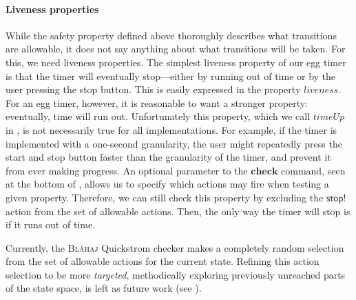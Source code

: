 \documentclass[sigplan,nonacm,10pt]{acmart}
\makeatletter
\newcommand{\Quickstrom}[0]{%
  \if@ACM@anonymous%
  \textsc{Bl\aa{}haj}%
  \else%
  Quickstrom%
  \fi\xspace}
\makeatother
\begin{document}
 \paragraph{Liveness properties} While the safety property defined above thoroughly describes what transitions are allowable, it does not say anything about what
 transitions will be taken. For this, we need liveness properties. The simplest liveness property of our egg timer is that the timer will eventually stop---either by running out of time or by the user pressing the stop button.
 This is easily expressed in the property $\mathit{liveness}$. For an egg timer, however, it is reasonable to want a stronger property: eventually, time will run out. Unfortunately this property, which we call $\mathit{timeUp}$ in , is not necessarily
 true for all implementations. For example, if the timer is implemented with a one-second granularity, the user might repeatedly press the start and stop button faster than the granularity of the timer, and prevent it
 from ever making progress. An optional parameter to the $\mathbf{check}$ command, seen at the bottom of , allows us to specify which actions may fire when testing a given property.
 Therefore, we can still check this property by excluding the $\mathsf{stop!}$ action from the set of allowable actions. Then, the only way the timer will stop is if it runs out of time.

 Currently, the \Quickstrom checker makes a completely random selection from the set of allowable actions for the current state. Refining this action selection to be more \emph{targeted}, methodically exploring previously unreached 
 parts of the state space, is left as future work (see ). 
\end{document}
